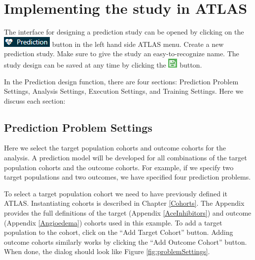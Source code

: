 \documentclass[11pt]{book}
\theoremstyle{definition}
\theoremstyle{definition}
\theoremstyle{definition}
\theoremstyle{remark}
\begin{document}
\hypertarget{implementing-the-study-in-atlas}{%
\section{Implementing the study in ATLAS}\label{implementing-the-study-in-atlas}}

The interface for designing a prediction study can be opened by clicking on the \includegraphics{images/PatientLevelPrediction/predictionButton.png} button in the left hand side ATLAS menu. Create a new prediction study. Make sure to give the study an easy-to-recognize name. The study design can be saved at any time by clicking the \includegraphics{images/PopulationLevelEstimation/save.png} button. 

In the Prediction design function, there are four sections: Prediction Problem Settings, Analysis Settings, Execution Settings, and Training Settings. Here we discuss each section:

\hypertarget{prediction-problem-settings}{%
\subsection{Prediction Problem Settings}\label{prediction-problem-settings}}

Here we select the target population cohorts and outcome cohorts for the analysis. A prediction model will be developed for all combinations of the target population cohorts and the outcome cohorts. For example, if we specify two target populations and two outcomes, we have specified four prediction problems.

To select a target population cohort we need to have previously defined it ATLAS. Instantiating cohorts is described in Chapter \ref{Cohorts}. The Appendix provides the full definitions of the target (Appendix \ref{AceInhibitors}) and outcome (Appendix \ref{Angioedema}) cohorts used in this example. To add a target population to the cohort, click on the ``Add Target Cohort'' button. Adding outcome cohorts similarly works by clicking the ``Add Outcome Cohort'' button. When done, the dialog should look like Figure \ref{fig:problemSettings}.
\end{document}
